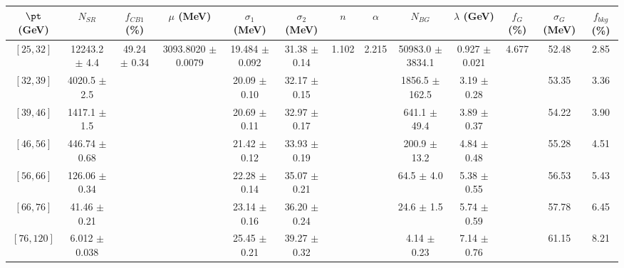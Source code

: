 \begin{tabular}{c||c|c|c|c|c|c|c|c|c|c|c||c}
$\pt$ (GeV) & $N_{SR}$ & $f_{CB1}$ (\%) & $\mu$ (MeV) & $\sigma_1$ (MeV) & $\sigma_2$ (MeV) & $n$ & $\alpha$ & $N_{BG}$ & $\lambda$ (GeV) & $f_G$ (\%) & $\sigma_G$ (MeV) & $f_{bkg}$ (\%) \\
\hline
$[25, 32]$ & 12243.2 $\pm$ 4.4 & \multirow{7}{*}{49.24 $\pm$ 0.34} & \multirow{7}{*}{3093.8020 $\pm$ 0.0079} & 19.484 $\pm$ 0.092 & 31.38 $\pm$ 0.14 & \multirow{7}{*}{1.102} & \multirow{7}{*}{2.215} & 50983.0 $\pm$ 3834.1 & 0.927 $\pm$ 0.021 & \multirow{7}{*}{4.677} & 52.48 & 2.85\\
$[32, 39]$ & 4020.5 $\pm$ 2.5 &  &  & 20.09 $\pm$ 0.10 & 32.17 $\pm$ 0.15 &  &  & 1856.5 $\pm$ 162.5 & 3.19 $\pm$ 0.28 &  & 53.35 & 3.36\\
$[39, 46]$ & 1417.1 $\pm$ 1.5 &  &  & 20.69 $\pm$ 0.11 & 32.97 $\pm$ 0.17 &  &  & 641.1 $\pm$ 49.4 & 3.89 $\pm$ 0.37 &  & 54.22 & 3.90\\
$[46, 56]$ & 446.74 $\pm$ 0.68 &  &  & 21.42 $\pm$ 0.12 & 33.93 $\pm$ 0.19 &  &  & 200.9 $\pm$ 13.2 & 4.84 $\pm$ 0.48 &  & 55.28 & 4.51\\
$[56, 66]$ & 126.06 $\pm$ 0.34 &  &  & 22.28 $\pm$ 0.14 & 35.07 $\pm$ 0.21 &  &  & 64.5 $\pm$ 4.0 & 5.38 $\pm$ 0.55 &  & 56.53 & 5.43\\
$[66, 76]$ & 41.46 $\pm$ 0.21 &  &  & 23.14 $\pm$ 0.16 & 36.20 $\pm$ 0.24 &  &  & 24.6 $\pm$ 1.5 & 5.74 $\pm$ 0.59 &  & 57.78 & 6.45\\
$[76, 120]$ & 6.012 $\pm$ 0.038 &  &  & 25.45 $\pm$ 0.21 & 39.27 $\pm$ 0.32 &  &  & 4.14 $\pm$ 0.23 & 7.14 $\pm$ 0.76 &  & 61.15 & 8.21\\
\end{tabular}
